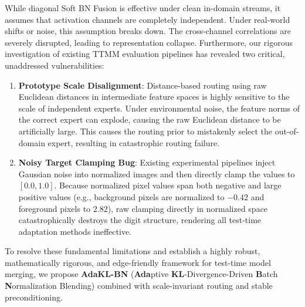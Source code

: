 \documentclass{article}
\begin{document}
While diagonal Soft BN Fusion is effective under clean in-domain streams, it assumes that activation channels are completely independent. Under real-world shifts or noise, this assumption breaks down. The cross-channel correlations are severely disrupted, leading to representation collapse. Furthermore, our rigorous investigation of existing TTMM evaluation pipelines has revealed two critical, unaddressed vulnerabilities:
\begin{enumerate}
    \item \textbf{Prototype Scale Disalignment}: Distance-based routing using raw Euclidean distances in intermediate feature spaces is highly sensitive to the scale of independent experts. Under environmental noise, the feature norms of the correct expert can explode, causing the raw Euclidean distance to be artificially large. This causes the routing prior to mistakenly select the out-of-domain expert, resulting in catastrophic routing failure.
    \item \textbf{Noisy Target Clamping Bug}: Existing experimental pipelines inject Gaussian noise into normalized images and then directly clamp the values to $[0.0, 1.0]$. Because normalized pixel values span both negative and large positive values (e.g., background pixels are normalized to $-0.42$ and foreground pixels to $2.82$), raw clamping directly in normalized space catastrophically destroys the digit structure, rendering all test-time adaptation methods ineffective.
\end{enumerate}

To resolve these fundamental limitations and establish a highly robust, mathematically rigorous, and edge-friendly framework for test-time model merging, we propose \textbf{AdaKL-BN} (\textbf{Ada}ptive \textbf{KL}-Divergence-Driven \textbf{B}atch \textbf{N}ormalization Blending) combined with scale-invariant routing and stable preconditioning. 
\end{document}
